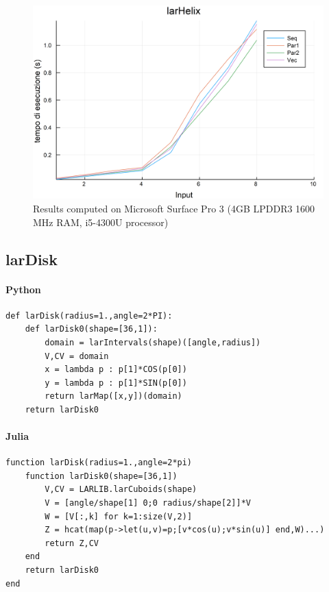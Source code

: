 \documentclass{article}
\begin{document}
\begin{figure}[htbp] 
\centering 
\includegraphics[scale=.13]{larHelixTime.png} 
\caption{Results computed on Microsoft Surface Pro  3 (4GB LPDDR3 1600 MHz RAM, i5-4300U processor)} 
\end{figure}


\subsection{larDisk}

\paragraph{Python}

\begin{verbatim}
def larDisk(radius=1.,angle=2*PI):
    def larDisk0(shape=[36,1]):
        domain = larIntervals(shape)([angle,radius])
        V,CV = domain
        x = lambda p : p[1]*COS(p[0])
        y = lambda p : p[1]*SIN(p[0])
        return larMap([x,y])(domain)
    return larDisk0
\end{verbatim}

\paragraph{Julia}
\begin{verbatim}
function larDisk(radius=1.,angle=2*pi)
    function larDisk0(shape=[36,1])
        V,CV = LARLIB.larCuboids(shape)
        V = [angle/shape[1] 0;0 radius/shape[2]]*V
        W = [V[:,k] for k=1:size(V,2)]
        Z = hcat(map(p->let(u,v)=p;[v*cos(u);v*sin(u)] end,W)...)
        return Z,CV
    end
    return larDisk0    
end
\end{verbatim}
\end{document}
